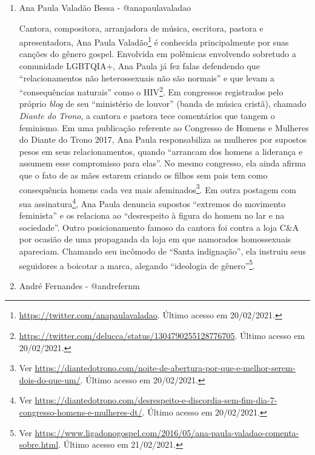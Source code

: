 \documentclass[
	12pt,				%
	openright,			%
	twoside,			%
	a4paper,			%
	english,			%
	brazil				%
	]{abntex2}
\begin{document}
\begin{anexosenv}
\begin{enumerate}
 \item Ana Paula Valadão Bessa - @anapaulavaladao\label{anapaulav}
 
 Cantora, compositora, arranjadora de música, escritora, pastora e apresentadora, Ana Paula Valadão\footnote{\url{https://twitter.com/anapaulavaladao}. Último acesso em 20/02/2021.} é conhecida principalmente por suas canções do gênero gospel. Envolvida em polêmicas envolvendo sobretudo a comunidade LGBTQIA+, Ana Paula já fez falas defendendo que ``relacionamentos não heterossexuais não são normais'' e que levam a ``consequências naturais'' como o HIV\footnote{\url{https://twitter.com/delucca/status/1304790255128776705}. Último acesso em 20/02/2021.}. Em congressos registrados pelo próprio \textit{blog} de seu ``ministério de louvor'' (banda de música cristã), chamado \textit{Diante do Trono}, a cantora e pastora tece comentários que tangem o feminismo. Em uma publicação referente ao Congresso de Homens e Mulheres do Diante do Trono 2017, Ana Paula responsabiliza as mulheres por supostos pesos em seus relacionamentos, quando ``arrancam dos homens a liderança e assumem esse compromisso para elas''. No mesmo congresso, ela ainda afirma que o fato de as mães estarem criando os filhos sem pais tem como consequência homens cada vez mais afeminados\footnote{Ver \url{https://diantedotrono.com/noite-de-abertura-por-que-e-melhor-serem-dois-do-que-um/}. Último acesso em 20/02/2021.}. Em outra postagem com sua assinatura\footnote{Ver \url{https://diantedotrono.com/desrespeito-e-discordia-sem-fim-dia-7-congresso-homens-e-mulheres-dt/}. Último acesso em 20/02/2021.}, Ana Paula denuncia supostos ``extremos do movimento feminista'' e os relaciona ao ``desrespeito à figura do homem no lar e na sociedade''. Outro posicionamento famoso da cantora foi contra a loja C&A por ocasião de uma propaganda da loja em que namorados homossexuais apareciam. Chamando seu incômodo de ``Santa indignação'', ela instruiu seus seguidores a boicotar a marca, alegando ``ideologia de gênero''\footnote{Ver \url{https://www.ligadonogospel.com/2016/05/ana-paula-valadao-comenta-sobre.html}. Último acesso em 21/02/2021.}.

 \item André Fernandes - @andrefernm
 

\end{enumerate}
\end{anexosenv}
\end{document}
